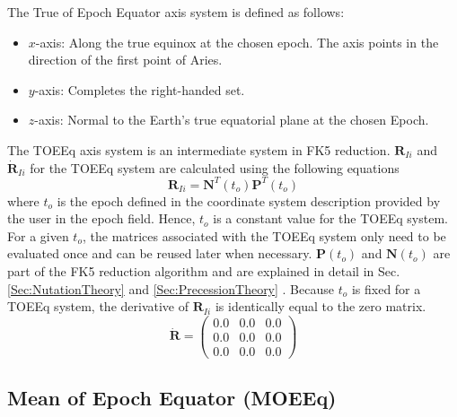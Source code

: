 {The True of Epoch Equator axis system is defined as follows:
%
\begin{itemize}
\item $x$-axis:  Along the true equinox at the chosen epoch.
                 The axis points in the direction of the
                 first point of Aries.
%
\item $y$-axis:  Completes the right-handed set.
%
\item $z$-axis:  Normal to the Earth's true equatorial plane at the chosen Epoch.
\end{itemize}
%
The TOEEq axis system is an intermediate system in FK5 reduction.
$\mathbf{R}_{Ii}$ and $ \dot{\mathbf{R}}_{Ii}$ for the TOEEq system
are calculated using the following equations
%
\begin{equation}
      \mathbf{R}_{Ii} = \mathbf{N}^T(t_o)\mathbf{P}^T(t_o)
\end{equation}
%
where $t_o$ is the epoch defined in the coordinate system
description provided by the user in the epoch field.  Hence, $t_o$
is a constant value for the TOEEq system.  For a given $t_o$, the
matrices associated with the TOEEq system only need to be evaluated
once and can be reused later when necessary. $\mathbf{P}(t_o)$ and
$\mathbf{N}(t_o)$ are part of the FK5 reduction algorithm and are
explained in detail in Sec. \ref{Sec:NutationTheory} and
\ref{Sec:PrecessionTheory} . Because $t_o$ is fixed for a TOEEq
system, the derivative of $\mathbf{R}_{Ii}$ is identically equal to
the zero matrix.
%
\begin{equation}
  \dot{\mathbf{R}} =   \begin{pmatrix}
     0.0 & 0.0 & 0.0\\
     0.0 & 0.0 & 0.0\\
     0.0 & 0.0 & 0.0
     \end{pmatrix}
\end{equation}


\subsection{Mean of Epoch Equator (MOEEq)}
\label{Sec:MOEEq} 

}
